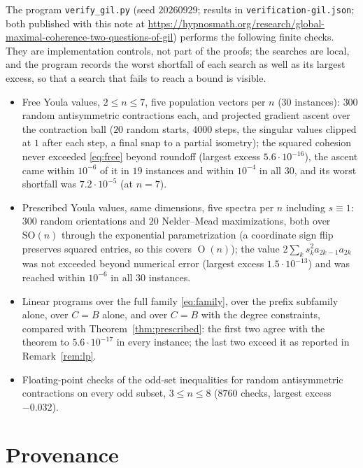 \documentclass[11pt]{article}
\DeclareMathOperator{\Orth}{O}
\begin{document}
The program \texttt{verify\_gil.py} (seed $20260929$; results in
\texttt{verification-gil.json}; both published with this note at
\url{https://hypnosmath.org/research/global-maximal-coherence-two-questions-of-gil}) performs
the following finite checks. They
are implementation controls, not part of the proofs; the searches are local,
and the program records the worst shortfall of each search as well as its
largest excess, so that a search that fails to reach a bound is visible.
\begin{itemize}
\item Free Youla values, $2\le n\le7$, five population vectors per $n$ ($30$
instances): $300$ random antisymmetric contractions each, and projected
gradient ascent over the contraction ball ($20$ random starts, $4000$ steps,
the singular values clipped at $1$ after each step, a final snap to a partial
isometry); the squared cohesion never exceeded \eqref{eq:free} beyond roundoff
(largest excess $5.6\cdot10^{-16}$), the ascent came within $10^{-6}$ of it in
$19$ instances and within $10^{-4}$ in all $30$, and its worst shortfall was
$7.2\cdot10^{-5}$ (at $n=7$).
\item Prescribed Youla values, same dimensions, five spectra per $n$ including
$s\equiv1$: $300$ random orientations and $20$ Nelder--Mead maximizations,
both over $\mathrm{SO}(n)$ through the exponential parametrization (a
coordinate sign flip preserves squared entries, so this covers $\Orth(n)$);
the value $2\sum_ks_k^2a_{2k-1}a_{2k}$ was not exceeded beyond numerical error
(largest excess $1.5\cdot10^{-13}$) and was reached within $10^{-6}$ in all
$30$ instances.
\item Linear programs over the full family \eqref{eq:family}, over the prefix
subfamily alone, over $C=B$ alone, and over $C=B$ with the degree constraints,
compared with Theorem~\ref{thm:prescribed}: the first two agree with the
theorem to $5.6\cdot10^{-17}$ in every instance; the last two exceed it as
reported in Remark~\ref{rem:lp}.
\item Floating-point checks of the odd-set inequalities for random
antisymmetric contractions on every odd subset, $3\le n\le8$ ($8760$
checks, largest excess $-0.032$).
\end{itemize}

\section{Provenance}\label{sec:provenance}
\end{document}
